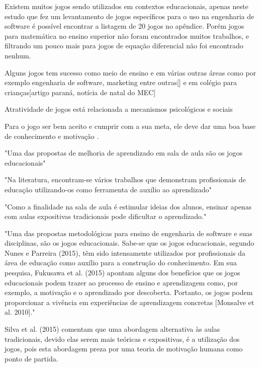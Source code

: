 Existem muitos jogos sendo utilizados em contextos educacionais, apenas neste estudo \cite{sucessoJogoEngSoft} que fez um levantamento de jogos específicos para o uso na engenharia de software é possível encontrar a listagem de 20 jogos no apêndice. Porém jogos para matemática no ensino superior não foram encontrados muitos trabalhos, e filtrando um pouco mais para jogos de equação diferencial não foi encontrado nenhum.


Alguns jogos tem sucesso como meio de ensino e em várias outras áreas como por exemplo engenharia de software, marketing entre outras[] e em colégio para crianças[artigo paraná, notícia de natal do MEC]

Atratividade de jogos está relacionada a mecanismos psicológicos e sociais \cite{sucessoJogoEngSoft}

Para o jogo ser bem aceito e cumprir com a sua meta, ele deve dar uma boa base de conhecimento e motivação \cite{sucessoJogoEngSoft}.

"Uma das propostas de melhoria de aprendizado em sala de aula são os jogos educacionais" \cite[p. 4]{sucessoJogoEngSoft}

"Na literatura, encontram-se vários trabalhos que demonstram profissionais de educação utilizando-os como ferramenta de auxílio ao aprendizado" \cite[p. 3]{sucessoJogoEngSoft}

"Como a finalidade na sala de aula é estimular ideias dos alunos, ensinar apenas com aulas expositivas
tradicionais pode dificultar o aprendizado." \cite[p. 4]{sucessoJogoEngSoft} 

"Uma das propostas metodológicas para ensino de engenharia de software e suas
disciplinas, são os jogos educacionais. Sabe-se que os jogos educacionais, segundo
Nunes e Parreira (2015), têm sido intensamente utilizados por profissionais da área de
educação como auxílio para a construção do conhecimento. Em sua pesquisa, Fukusawa
et al. (2015) apontam alguns dos benefícios que os jogos educacionais podem trazer ao
processo de ensino e aprendizagem como, por exemplo, a motivação e o aprendizado
por descoberta. Portanto, os jogos podem proporcionar a vivência em experiências de
aprendizagem concretas [Monsalve et al. 2010]." \cite[4]{sucessoJogoEngSoft}

Silva et al. (2015) comentam que uma abordagem alternativa às aulas tradicionais, devido elas
serem mais teóricas e expositivas, é a utilização dos jogos, pois esta abordagem preza
por uma teoria de motivação humana como ponto de partida. \cite{sucessoJogoEngSoft} 

